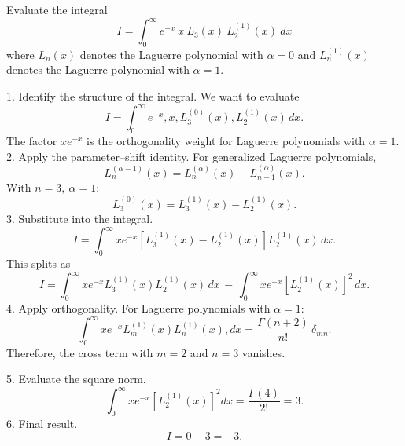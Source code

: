 Evaluate the integral
$$
I = \int_{0}^{\infty} e^{-x}\ x\ L_3(x)\ L_2^{(1)}(x)\ dx
$$
where $L_n(x)$ denotes the Laguerre polynomial with $\alpha = 0$ and $L_n^{(1)}(x)$ denotes the Laguerre polynomial with $\alpha = 1$.

1.	Identify the structure of the integral.
We want to evaluate
$$
I = \int_{0}^{\infty} e^{-x},x,L_3^{(0)}(x),L_2^{(1)}(x)\,dx.
$$
The factor $x e^{-x}$ is the orthogonality weight for Laguerre polynomials with $\alpha=1$.
2.	Apply the parameter–shift identity.
For generalized Laguerre polynomials,
$$
L_n^{(\alpha-1)}(x) = L_n^{(\alpha)}(x) - L_{n-1}^{(\alpha)}(x).
$$
With $n=3,\ \alpha=1$:
$$
L_3^{(0)}(x) = L_3^{(1)}(x) - L_2^{(1)}(x).
$$
3.	Substitute into the integral.
$$
I = \int_{0}^{\infty} x e^{-x}[L_3^{(1)}(x)-L_2^{(1)}(x)]L_2^{(1)}(x)\,dx.
$$
This splits as
$$
I = \int_{0}^{\infty} x e^{-x}L_3^{(1)}(x)L_2^{(1)}(x)\,dx \,-\,\int_{0}^{\infty} x e^{-x}[L_2^{(1)}(x)]^2\,dx.
$$
4.	Apply orthogonality.
For Laguerre polynomials with $\alpha=1$:
$$
\int_{0}^{\infty} x e^{-x} L_m^{(1)}(x) L_n^{(1)}(x),dx = \frac{\Gamma(n+2)}{n!}\,\delta_{mn}.
$$
Therefore, the cross term with $m=2$ and $n=3$ vanishes.

5.	Evaluate the square norm.
$$
\int_{0}^{\infty} x e^{-x}[L_2^{(1)}(x)]^2 dx = \frac{\Gamma(4)}{2!} = 3.
$$
6.	Final result.
$$
I = 0 - 3 = -3.
$$